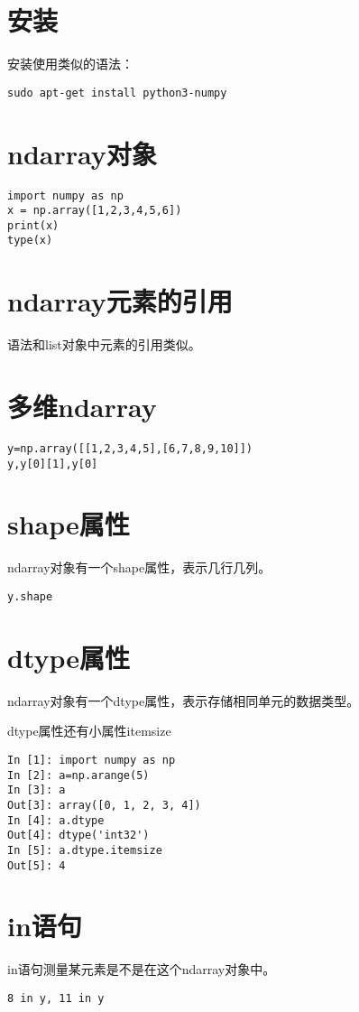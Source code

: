 \documentclass[12pt,oneside]{book}
\begin{document}
\begin{common-format}
\section{安装}
安装使用类似的语法：
\begin{Verbatim}
sudo apt-get install python3-numpy
\end{Verbatim}



\section{ndarray对象}
\begin{Verbatim}
import numpy as np
x = np.array([1,2,3,4,5,6])
print(x)
type(x)
\end{Verbatim}


\section{ndarray元素的引用}
语法和list对象中元素的引用类似。


\section{多维ndarray}
\begin{Verbatim}
y=np.array([[1,2,3,4,5],[6,7,8,9,10]])
y,y[0][1],y[0]
\end{Verbatim}


\section{shape属性}
ndarray对象有一个shape属性，表示几行几列。
\begin{Verbatim}
y.shape
\end{Verbatim}

\section{dtype属性}
ndarray对象有一个dtype属性，表示存储相同单元的数据类型。

dtype属性还有小属性itemsize
\begin{Verbatim}
In [1]: import numpy as np
In [2]: a=np.arange(5)
In [3]: a
Out[3]: array([0, 1, 2, 3, 4])
In [4]: a.dtype
Out[4]: dtype('int32')
In [5]: a.dtype.itemsize
Out[5]: 4
\end{Verbatim}




\section{in语句}
in语句测量某元素是不是在这个ndarray对象中。
\begin{Verbatim}
8 in y, 11 in y
\end{Verbatim}


\end{common-format}
\end{document}
